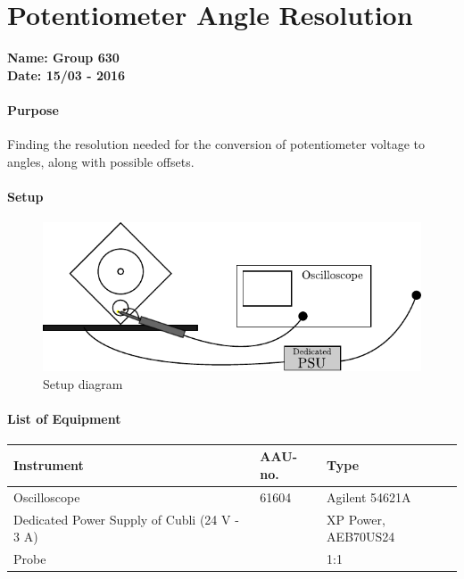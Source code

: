 \chapter{Potentiometer Angle Resolution}\label{app:potentiometerRes} 
\textbf{Name: Group 630}\\
\textbf{Date: 15/03 - 2016}

\subsubsection{Purpose}
Finding the resolution needed for the conversion of potentiometer voltage to angles, along with possible offsets.

\subsubsection{Setup}
\begin{figure}[H]
  \centering
	\includegraphics[scale=1]{figures/LabSetupRangeTest.pdf}
	\caption{Setup diagram}
	\label{LabSetupRangeTest2}
\end{figure}\vspace{-5mm}

\subsubsection{List of Equipment}
\begin{table}[H]
	\begin{tabular}{|l|l|p{4.3cm}|}
		\hline%
		\textbf{Instrument}                                  &  \textbf{AAU-no.}  &  \textbf{Type}                       \\
		\hline%
		Oscilloscope                                         &  61604             &  Agilent 54621A		                   \\
		\hline%
		Dedicated Power Supply of Cubli \small{(24 V - 3 A)} &                    &  XP Power, AEB70US24                 \\
		\hline%
		Probe                                          &                &   1:1   \\
		\hline%
	\end{tabular}
\end{table}

